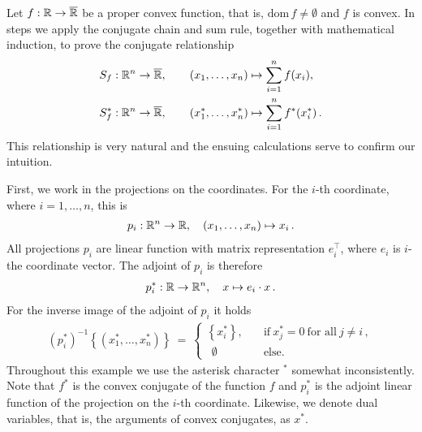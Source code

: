 \begin{example*}
  Let 
  $
    f:\mathbb{R}\to \overline{\mathbb{R}}
  $
  be a proper convex function, that is, 
  $
    \mathrm{dom}\,f
    \neq
    \emptyset
  $
  and $f$ is convex.
  In steps we apply the conjugate chain and sum rule, together with mathematical induction,
  to prove the conjugate relationship 
  \begin{align*}
    &S_f:\mathbb{R}^n \to \overline{\mathbb{R}},
    \qquad
    (x_1,\ldots,x_n)
    \mapsto
    \sum_{i=1}^{n} 
    f(x_i)
    ,
    \\
    &S_f^*:\mathbb{R}^n \to \overline{\mathbb{R}},
    \qquad
    (x^*_1,\ldots,x^*_n)
    \mapsto
    \sum_{i=1}^{n} 
    f^*(x^*_i)
    \,.
  \end{align*}
  This relationship is very natural and the ensuing calculations serve to confirm our intuition.

  First, we work in the projections on the coordinates. 
  For the $i$-th coordinate, where $i=1,\ldots,n$, this is 
  \begin{gather}
    p_i:\mathbb{R}^n\to \mathbb{R}
    ,
    \quad
    (x_1,\ldots,x_n)
    \mapsto
    x_i\,.
  \end{gather}
  All projections 
  $p_i$
  are linear function with matrix representation
  $
    e_i^\top
  $,
  where $e_i$ is $i$-the coordinate vector.
  The adjoint of $p_i$ is therefore
  \begin{gather}
    p^*_i:\mathbb{R}\to \mathbb{R}^n
    ,
    \quad
    x
    \mapsto
    e_i\cdot x
    \,.
  \end{gather}
  For the inverse image of the adjoint of $p_i$ it holds
  \begin{gather}
    (p_i^*)^{-1}
    \left\{ 
    (x_1^*,\ldots,x_n^*)
    \right\}
    \ 
    =
    \ 
    \begin{cases}
      \left\{ x_i^* \right\},
      \quad
      &\text{if}\ 
      x_j^*=0\ \text{for all}\ j\neq i\,,
      \\
      \ \ \emptyset
      \quad
      &\text{else.}
    \end{cases}
  \end{gather}
  Throughout this example we use the asterisk character $^*$ somewhat inconsistently. 
  Note that $f^*$ is the convex conjugate 
  of the function $f$ and $p_i^*$ is the adjoint linear function of the projection on the $i$-th coordinate. Likewise, we denote dual variables, that is, the arguments of convex conjugates, as $x^*$.


\end{example*}
